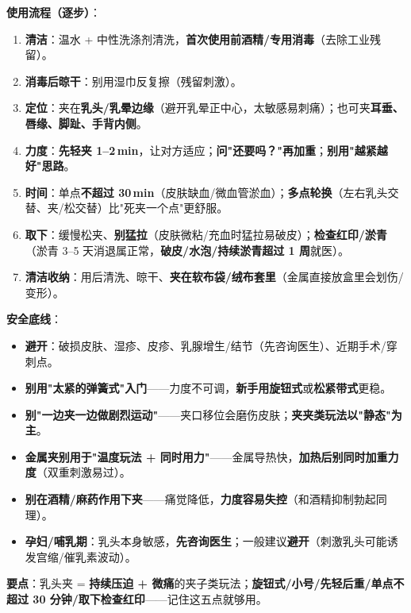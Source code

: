 \documentclass[12pt,UTF8,openany]{ctexbook}
\begin{document}
\noindent\textbf{使用流程（逐步）}：
\begin{enumerate}[leftmargin=2em,itemsep=0.2em]
  \item \textbf{清洁}：温水 + 中性洗涤剂清洗，\textbf{首次使用前酒精/专用消毒}（去除工业残留）。
  \item \textbf{消毒后晾干}：别用湿巾反复擦（残留刺激）。
  \item \textbf{定位}：夹在\textbf{乳头/乳晕边缘}（避开乳晕正中心，太敏感易刺痛）；也可夹\textbf{耳垂、唇缘、脚趾、手背内侧}。
  \item \textbf{力度}：\textbf{先轻夹 1--2\,min}，让对方适应；\textbf{问"还要吗？"再加重}；\textbf{别用"越紧越好"思路}。
  \item \textbf{时间}：单点\textbf{不超过 30\,min}（皮肤缺血/微血管淤血）；\textbf{多点轮换}（左右乳头交替、夹/松交替）比"死夹一个点"更舒服。
  \item \textbf{取下}：缓慢松夹、\textbf{别猛拉}（皮肤微粘/充血时猛拉易破皮）；\textbf{检查红印/淤青}（淤青 3--5 天消退属正常，\textbf{破皮/水泡/持续淤青超过 1 周}就医）。
  \item \textbf{清洁收纳}：用后清洗、晾干、\textbf{夹在软布袋/绒布套里}（金属直接放盒里会划伤/变形）。
\end{enumerate}

\noindent\textbf{安全底线}：
\begin{itemize}[leftmargin=2em,itemsep=0.2em]
  \item \textbf{避开}：破损皮肤、湿疹、皮疹、乳腺增生/结节（先咨询医生）、近期手术/穿刺点。
  \item \textbf{别用"太紧的弹簧式"入门}——力度不可调，\textbf{新手用旋钮式}或\textbf{松紧带式}更稳。
  \item \textbf{别"一边夹一边做剧烈运动"}——夹口移位会磨伤皮肤；\textbf{夹夹类玩法以"静态"为主}。
  \item \textbf{金属夹别用于"温度玩法 + 同时用力"}——金属导热快，\textbf{加热后别同时加重力度}（双重刺激易过）。
  \item \textbf{别在酒精/麻药作用下夹}——痛觉降低，\textbf{力度容易失控}（和酒精抑制勃起同理）。
  \item \textbf{孕妇/哺乳期}：乳头本身敏感，\textbf{先咨询医生}；一般建议\textbf{避开}（刺激乳头可能诱发宫缩/催乳素波动）。
\end{itemize}

\noindent\textbf{要点}：乳头夹 = \textbf{持续压迫 + 微痛}的夹子类玩法；\textbf{旋钮式/小号/先轻后重/单点不超过 30 分钟/取下检查红印}——记住这五点就够用。
\end{document}
